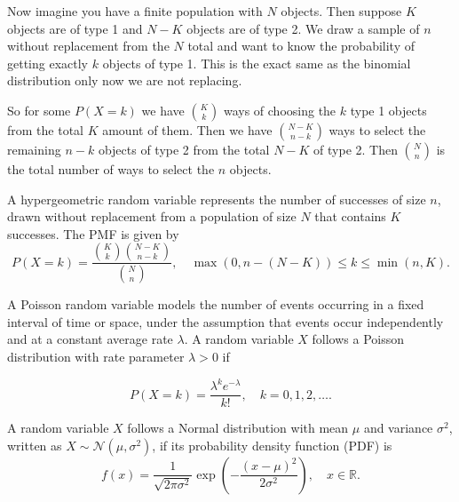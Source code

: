\documentclass[../main.tex]{subfiles}
\begin{document}
\par Now imagine you have a finite population with 
$N$ objects. Then suppose $K$ objects are of type 1 and $N-K$ objects
are of type 2. We draw a sample of $n$ without replacement from the $N$ total and 
want to know the probability of getting exactly $k$ objects of type 1. This is the exact 
same as the binomial distribution only now we are not replacing. 
\par So for some $P(X=k)$ we have $\binom{K}{k}$ ways 
of choosing the $k$ type 1 objects from the total $K$ amount of them. Then we have $\binom{N-K}{n-k}$ ways
to select the remaining $n-k$ objects of type 2 from the total $N-K$ of type 2.
Then $\binom{N}{n}$ is the total number of ways to select the $n$ objects. 

\begin{definition}
A hypergeometric random variable represents the number of successes of size $n$, drawn without replacement from a population of size \( N \) that contains \( K \) successes. The PMF is given by
\[
P(X = k) = \frac{\binom{K}{k} \binom{N - K}{n - k}}{\binom{N}{n}}, \quad \max(0, n - (N - K)) \leq k \leq \min(n, K).
\]
\end{definition}



\begin{definition}
A Poisson random variable models the number of events occurring in a fixed interval of time or space, under the assumption that events occur independently and at a constant average rate \( \lambda \).
A random variable \( X \) follows a Poisson distribution with rate parameter \( \lambda > 0 \) if

\[
P(X = k) = \frac{\lambda^k e^{-\lambda}}{k!}, \quad k = 0, 1, 2, \dots.
\]


\end{definition}


\begin{definition}
A random variable \( X \) follows a Normal distribution with mean \( \mu \) and variance \( \sigma^2 \), written as \( X \sim \mathcal{N}(\mu, \sigma^2) \), if its probability density function (PDF) is
\[
f(x) = \frac{1}{\sqrt{2\pi\sigma^2}} \exp \left( -\frac{(x - \mu)^2}{2\sigma^2} \right), \quad x \in \mathbb{R}.
\]
\end{definition}
\end{document}
